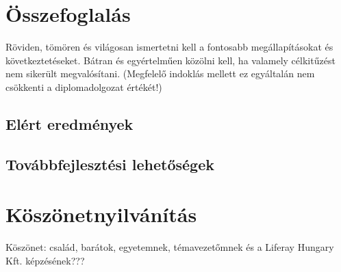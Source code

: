 \documentclass[hidelinks, 12pt, a4paper]{report}
\begin{document}
\chapter{Összefoglalás}

Röviden, tömören és világosan ismertetni kell a fontosabb megállapításokat és következtetéseket. Bátran és egyértelműen közölni kell, ha valamely célkitűzést nem sikerült megvalósítani. (Megfelelő indoklás mellett ez egyáltalán nem csökkenti a diplomadolgozat értékét!)

\section{Elért eredmények}

\section{Továbbfejlesztési lehetőségek}

\clearpage
{}
\chapter*{Köszönetnyilvánítás}

Köszönet: család, barátok, egyetemnek, témavezetőmnek és a Liferay Hungary Kft. képzésének???

\end{document}
